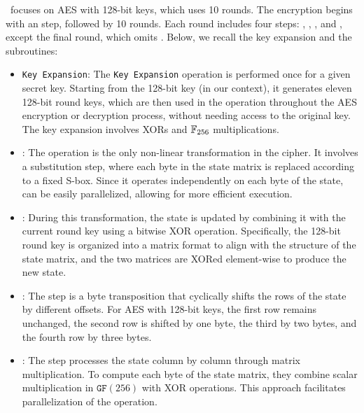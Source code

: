 \hippo~focuses on \gls{AES} with 128-bit keys, which uses 10 rounds. The encryption begins with an \AddRoundKey step, followed by 10 rounds. Each round includes four steps: \SubBytes, \ShiftRows, \MixColumns, and \AddRoundKey, except the final round, which omits \MixColumns. Below, we recall the key expansion and the subroutines:
\begin{itemize}
\item \texttt{Key Expansion}: The \texttt{Key Expansion} operation is performed once for a given secret key. Starting from the 128-bit key (in our context), it generates eleven 128-bit round keys, which are then used in the \AddRoundKey operation throughout the \gls{AES} encryption or decryption process, without needing access to the original key. The key expansion involves XORs and $\mathbb{F}_{256}$ multiplications.

    \item \SubBytes: The \SubBytes operation is the only non-linear transformation in the cipher. It involves a substitution step, where each byte in the state matrix is replaced according to a fixed S-box. Since it operates independently on each byte of the state, \SubBytes can be easily parallelized, allowing for more efficient execution.
    \item \AddRoundKey: 
    During this transformation, the state is updated by combining it with the current round key using a bitwise XOR operation. Specifically, the 128-bit round key is organized into a matrix format to align with the structure of the state matrix, and the two matrices are XORed element-wise to produce the new state.
   
    \item \ShiftRows: The \ShiftRows step is a byte transposition that cyclically shifts the rows of the state by different offsets. For \gls{AES} with 128-bit keys, the first row remains unchanged, the second row is shifted by one byte, the third by two bytes, and the fourth row by three bytes. 

    \item \MixColumns: The \MixColumns step processes the state column by column through matrix multiplication. To compute each byte of the state matrix, they combine scalar multiplication in $\mathtt{GF}(256)$ with XOR operations. This approach facilitates parallelization of the operation.  
    
    
\end{itemize}

